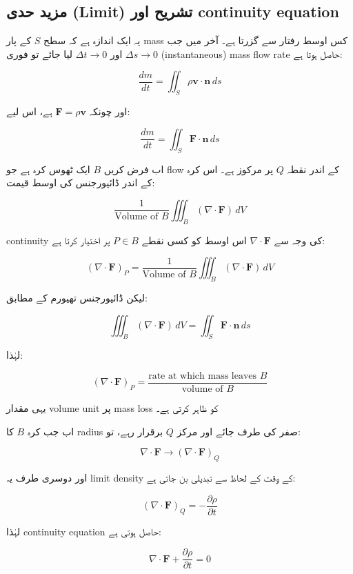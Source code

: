 \begin{enumerate}
\subsection*{مزید حدی (Limit) تشریح اور continuity equation}

یہ ایک اندازہ ہے کہ سطح \( S \) کے پار mass کس اوسط رفتار سے گزرتا ہے۔ آخر میں جب \( \Delta s \to 0 \) اور \( \Delta t \to 0 \) لیا جائے تو فوری (instantaneous) mass flow rate حاصل ہوتا ہے:

\[
\frac{dm}{dt}
=
\iint_S \rho \mathbf{v}\cdot \mathbf{n}\, ds
\]

اور چونکہ \( \mathbf{F} = \rho \mathbf{v} \) ہے، اس لیے:

\[
\frac{dm}{dt}
=
\iint_S \mathbf{F}\cdot \mathbf{n}\, ds
\]

\bigskip

اب فرض کریں \( B \) ایک ٹھوس کرہ ہے جو flow کے اندر نقطہ \( Q \) پر مرکوز ہے۔ اس کرہ کے اندر ڈائیورجنس کی اوسط قیمت:

\[
\frac{1}{\text{Volume of } B}
\iiint_B (\nabla \cdot \mathbf{F})\, dV
\]

continuity کی وجہ سے \( \nabla \cdot \mathbf{F} \) اس اوسط کو کسی نقطے \( P \in B \) پر اختیار کرتا ہے:

\[
(\nabla \cdot \mathbf{F})_P
=
\frac{1}{\text{Volume of } B}
\iiint_B (\nabla \cdot \mathbf{F})\, dV
\]

لیکن ڈائیورجنس تھیورم کے مطابق:

\[
\iiint_B (\nabla \cdot \mathbf{F})\, dV
=
\iint_S \mathbf{F}\cdot \mathbf{n}\, ds
\]

لہٰذا:

\[
(\nabla \cdot \mathbf{F})_P
=
\frac{\text{rate at which mass leaves } B}{\text{volume of } B}
\tag{8}
\]

یہی مقدار volume unit پر mass loss کو ظاہر کرتی ہے۔

\bigskip

اب جب کرہ \( B \) کا radius صفر کی طرف جائے اور مرکز \( Q \) برقرار رہے، تو:

\[
\nabla \cdot \mathbf{F} \to (\nabla \cdot \mathbf{F})_Q
\]

اور دوسری طرف یہ limit density کے وقت کے لحاظ سے تبدیلی بن جاتی ہے:

\[
(\nabla \cdot \mathbf{F})_Q
=
-\frac{\partial \rho}{\partial t}
\]

لہٰذا continuity equation حاصل ہوتی ہے:

\[
\nabla \cdot \mathbf{F}
+
\frac{\partial \rho}{\partial t}
= 0
\]

\bigskip


\end{enumerate}
